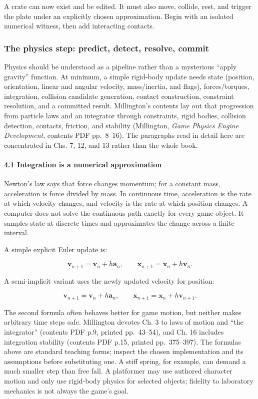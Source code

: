 A crate can now exist and be edited. It must also move, collide, rest, and trigger the plate under an explicitly chosen approximation. Begin with an isolated numerical witness, then add interacting contacts.

\subsubsection{The physics step: predict, detect, resolve, commit}\label{06-engine-ii-ch033-the-physics-step-predict-detect-resolve-commit}

Physics should be understood as a pipeline rather than a mysterious ``apply gravity'' function. At minimum, a simple rigid-body update needs state (position, orientation, linear and angular velocity, mass/inertia, and flags), forces/torques, integration, collision candidate generation, contact construction, constraint resolution, and a committed result. Millington's contents lay out that progression from particle laws and an integrator through constraints, rigid bodies, collision detection, contacts, friction, and stability (Millington, \emph{Game Physics Engine Development}, contents PDF pp.~8--16). The paragraphs read in detail here are concentrated in Chs. 7, 12, and 13 rather than the whole book.

\paragraph{4.1 Integration is a numerical approximation}\label{06-engine-ii-ch033-integration-is-a-numerical-approximation}

Newton's law says that force changes momentum; for a constant mass, acceleration is force divided by mass. In continuous time, acceleration is the rate at which velocity changes, and velocity is the rate at which position changes. A computer does not solve the continuous path exactly for every game object. It samples state at discrete times and approximates the change across a finite interval.

A simple explicit Euler update is:

\[
\mathbf{v}_{n+1}=\mathbf{v}_n+h\mathbf{a}_n,
\qquad
\mathbf{x}_{n+1}=\mathbf{x}_n+h\mathbf{v}_n.
\]

A semi-implicit variant uses the newly updated velocity for position:

\[
\mathbf{v}_{n+1}=\mathbf{v}_n+h\mathbf{a}_n,
\qquad
\mathbf{x}_{n+1}=\mathbf{x}_n+h\mathbf{v}_{n+1}.
\]

The second formula often behaves better for game motion, but neither makes arbitrary time steps safe. Millington devotes Ch. 3 to laws of motion and ``the integrator'' (contents PDF p.9, printed pp.~43--54), and Ch. 16 includes integration stability (contents PDF p.15, printed pp.~375--397). The formulas above are standard teaching forms; inspect the chosen implementation and its assumptions before substituting one. A stiff spring, for example, can demand a much smaller step than free fall. A platformer may use authored character motion and only use rigid-body physics for selected objects; fidelity to laboratory mechanics is not always the game's goal.

